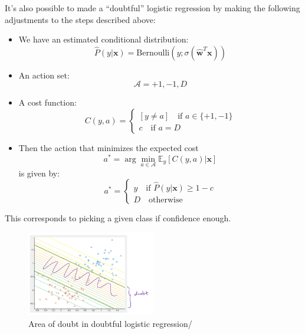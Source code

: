 \documentclass[a4paper,10pt,twoside]{article}
\begin{document}
It's also possible to made a ``doubtful'' logistic regression by making the following adjustments to the steps described above:

\begin{itemize}
\item We have an estimated conditional distribution:
  \begin{equation*}
    \hat{P}(y|\mathbf{x})=\mathrm{Bernoulli}(y;\sigma(\hat{\mathbf{w}}^T\mathbf{x}))
  \end{equation*}
\item An action set:
  \begin{equation*}
    \mathcal{A} = {+1,-1, D}
  \end{equation*}
\item A cost function:
  \begin{equation*}
    C(y,a)=
    \begin{cases}
      [y\neq a]\quad\text{if }a\in\{+1,-1\}\\
      c\quad \text{if } a=D
    \end{cases}
  \end{equation*}
\item Then the action that minimizes the expected cost
  \begin{equation*}
    a^*=\arg\min_{a\in\mathcal{A}}\mathbb{E}_y[C(y,a)|\mathbf{x}]
  \end{equation*}
  is given by:
  \begin{equation*}
    a^*=
    \begin{cases}
      y\quad\text{if }\hat{P}(y|\mathbf{x})\geq 1-c\\
      D\quad\text{otherwise }

    \end{cases}
  \end{equation*}
\end{itemize}
This corresponds to picking a given class if confidence enough.

\begin{figure}
  \centering
  \includegraphics[width=0.5\textwidth]{figures/doubtful_classification.png}
  \caption{Area of doubt in doubtful logistic regression/}
  \label{fig:doubt_doubtful_classification}
\end{figure}
\end{document}
